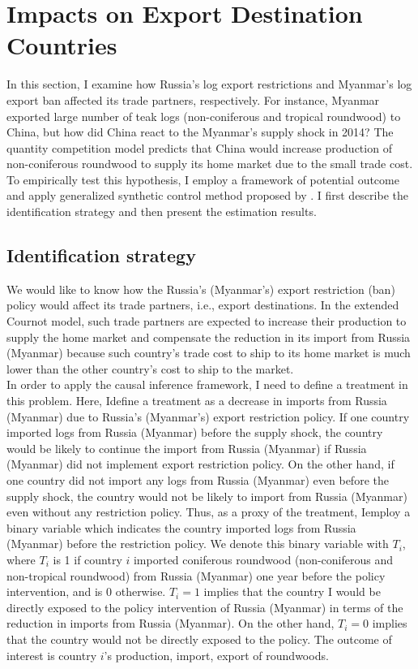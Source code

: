 \documentclass[a4paper,12pt]{article}
\begin{document}
\section{Impacts on Export Destination Countries}
In this section, I examine how Russia's log export restrictions and Myanmar's log export ban affected its trade partners, respectively. For instance, Myanmar exported large number of teak logs (non-coniferous and tropical roundwood) to China, but how did China react to the Myanmar's supply shock in 2014? The quantity competition model predicts that China would increase production of non-coniferous roundwood to supply its home market due to the small trade cost. To empirically test this hypothesis, I employ a framework of potential outcome and apply generalized synthetic control method proposed by \cite{xu2017generalized}. I first describe the identification strategy and then present the estimation results.

\subsection{Identification strategy}

We would like to know how the Russia's (Myanmar's) export restriction (ban) policy would affect its trade partners, i.e., export destinations. In the extended Cournot model, such trade partners are expected to increase their production to supply the home market and compensate the reduction in its import from Russia (Myanmar) because such country's trade cost to ship to its home market is much lower than the other country's cost to ship to the market. \\

In order to apply the causal inference framework, I need to define a treatment in this problem. Here, Idefine a treatment as a decrease in imports from Russia (Myanmar) due to Russia's (Myanmar's) export restriction policy. If one country imported logs from Russia (Myanmar) before the supply shock, the country would be likely to continue the import from Russia (Myanmar) if Russia (Myanmar) did not implement export restriction policy. On the other hand, if one country did not import any logs from Russia (Myanmar) even before the supply shock, the country would not be likely to import from Russia (Myanmar) even without any restriction policy. Thus, as a proxy of the treatment, Iemploy a binary variable which indicates the country imported logs from Russia (Myanmar) before the restriction policy. We denote this binary variable with $T_i$, where $T_i$ is 1 if country $i$ imported coniferous roundwood (non-coniferous and non-tropical roundwood) from Russia (Myanmar) one year before the policy intervention, and is 0 otherwise. $T_i = 1$ implies that the country I would be directly exposed to the policy intervention of Russia (Myanmar) in terms of the reduction in imports from Russia (Myanmar). On the other hand, $T_i = 0$ implies that the country would not be directly exposed to the policy. The outcome of interest is country $i$'s production, import, export of roundwoods.\\
\end{document}
